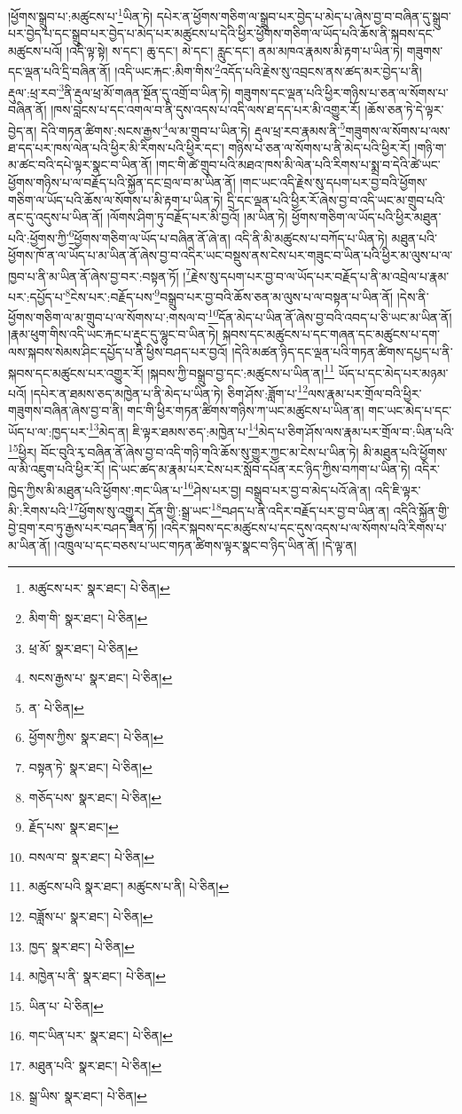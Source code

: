 །ཕྱོགས་སྒྲུབ་པ་:མཚུངས་པ་\footnote{མཚུངས་པར་  སྣར་ཐང་།  པེ་ཅིན། }ཡིན་ཏེ། དཔེར་ན་ཕྱོགས་གཅིག་ལ་སྒྲུབ་པར་བྱེད་པ་མེད་པ་ཞེས་བྱ་བ་བཞིན་དུ་སྒྲུབ་པར་བྱེད་པ་དང་སྒྲུབ་པར་བྱེད་པ་མེད་པར་མཚུངས་པ་དེའི་ཕྱིར་ཕྱོགས་གཅིག་ལ་ཡོད་པའི་ཆོས་ནི་སྐབས་དང་མཚུངས་པའོ། །འདི་ལྟ་སྟེ། ས་དང་། ཆུ་དང་། མེ་དང་། རླུང་དང་། ནམ་མཁའ་རྣམས་མི་རྟག་པ་ཡིན་ཏེ། གཟུགས་དང་ལྡན་པའི་དྲི་བཞིན་ནོ། །འདི་ཡང་རྐང་:མིག་གིས་\footnote{མིག་གི་  སྣར་ཐང་།  པེ་ཅིན། }འདོད་པའི་རྗེས་སུ་འབྲངས་ནས་ཚད་མར་བྱེད་པ་ནི། རྡུལ་:ཕྲ་རབ་\footnote{ཕྲ་མོ་  སྣར་ཐང་།  པེ་ཅིན། }ནི་རྡུལ་ཕྲ་མོ་གཞན་སྔོན་དུ་འགྲོ་བ་ཡིན་ཏེ། གཟུགས་དང་ལྡན་པའི་ཕྱིར་གཉིས་པ་ཅན་ལ་སོགས་པ་བཞིན་ནོ། །ཁས་བླངས་པ་དང་འགལ་བ་ནི་དུས་འདས་པ་འདི་ལས་ཐ་དད་པར་མི་འགྱུར་རོ། །ཆོས་ཅན་ཏེ་དེ་ལྟར་བྱེད་ན། དེའི་གཏན་ཚིགས་:སངས་རྒྱས་\footnote{སངས་རྒྱས་པ་  སྣར་ཐང་།  པེ་ཅིན། }ལ་མ་གྲུབ་པ་ཡིན་ཏེ། རྡུལ་ཕྲ་རབ་རྣམས་ནི་\footnote{ན་  པེ་ཅིན། }གཟུགས་ལ་སོགས་པ་ལས་ཐ་དད་པར་ཁས་ལེན་པའི་ཕྱིར་མི་རིགས་པའི་ཕྱིར་དང་། གཉིས་པ་ཅན་ལ་སོགས་པ་ནི་མེད་པའི་ཕྱིར་རོ། །གཉི་ག་མ་ཚང་བའི་དཔེ་ལྟར་སྣང་བ་ཡིན་ནོ། །གང་གི་ཚེ་གྲུབ་པའི་མཐའ་ཁས་མི་ལེན་པའི་རིགས་པ་སྨྲ་བ་དེའི་ཚེ་ཡང་ཕྱོགས་གཉིས་པ་ལ་བརྗོད་པའི་སྐྱོན་དང་བྲལ་བ་མ་ཡིན་ནོ། །གང་ཡང་འདི་རྗེས་སུ་དཔག་པར་བྱ་བའི་ཕྱོགས་གཅིག་ལ་ཡོད་པའི་ཆོས་ལ་སོགས་པ་མི་རྟག་པ་ཡིན་ཏེ། དྲི་དང་ལྡན་པའི་ཕྱིར་རོ་ཞེས་བྱ་བ་འདི་ཡང་མ་གྲུབ་པའི་ནང་དུ་འདུས་པ་ཡིན་ནོ། །ལོགས་ཤིག་ཏུ་བརྗོད་པར་མི་བྱའོ། །མ་ཡིན་ཏེ། ཕྱོགས་གཅིག་ལ་ཡོད་པའི་ཕྱིར་མཐུན་པའི་:ཕྱོགས་ཀྱི་\footnote{ཕྱོགས་ཀྱིས་  སྣར་ཐང་།  པེ་ཅིན། }ཕྱོགས་གཅིག་ལ་ཡོད་པ་བཞིན་ནོ་ཞེ་ན། འདི་ནི་མི་མཚུངས་པ་བཀོད་པ་ཡིན་ཏེ། མཐུན་པའི་ཕྱོགས་ཁོ་ན་ལ་ཡོད་པ་མ་ཡིན་ནོ་ཞེས་བྱ་བ་འདིར་ཡང་བསྡུས་ནས་ངེས་པར་གཟུང་བ་ཡིན་པའི་ཕྱིར་མ་ལུས་པ་ལ་ཁྱབ་པ་ནི་མ་ཡིན་ནོ་ཞེས་བྱ་བར་:བསྟན་ཏོ། །\footnote{བསྟན་ཏེ་  སྣར་ཐང་།  པེ་ཅིན། }རྗེས་སུ་དཔག་པར་བྱ་བ་ལ་ཡོད་པར་བརྗོད་པ་ནི་མ་འབྲེལ་པ་རྣམ་པར་:དཔྱོད་པ་\footnote{གཅོད་པས་  སྣར་ཐང་།  པེ་ཅིན། }ངེས་པར་:བརྗོད་པས་\footnote{རྗོད་པས་  སྣར་ཐང་། }བསྒྲུབ་པར་བྱ་བའི་ཆོས་ཅན་མ་ལུས་པ་ལ་བསྟན་པ་ཡིན་ནོ། །དེས་ནི་ཕྱོགས་གཅིག་ལ་མ་གྲུབ་པ་ལ་སོགས་པ་:གསལ་བ་\footnote{བསལ་བ་  སྣར་ཐང་།  པེ་ཅིན། }དོན་མེད་པ་ཡིན་ནོ་ཞེས་བྱ་བའི་འབད་པ་ཅི་ཡང་མ་ཡིན་ནོ། །རྣམ་ཕུག་གིས་འདི་ཡང་རྐང་པ་རྡུང་དུ་ལྷུང་བ་ཡིན་ཏེ། སྐབས་དང་མཚུངས་པ་དང་གཞན་དང་མཚུངས་པ་དག་ལས་སྐབས་སེམས་ཤིང་དཔྱོད་པ་ནི་ཕྱིས་བཤད་པར་བྱའོ། །དེའི་མཚན་ཉིད་དང་ལྡན་པའི་གཏན་ཚིགས་དཔྱད་པ་ནི་སྐབས་དང་མཚུངས་པར་འགྱུར་རོ། །སྐབས་ཀྱི་བསྒྲུབ་བྱ་དང་:མཚུངས་པ་ཡིན་ན།\footnote{མཚུངས་པའི  སྣར་ཐང་། མཚུངས་པ་ནི།  པེ་ཅིན། } ཡོད་པ་དང་མེད་པར་མཉམ་པའོ། །དཔེར་ན་ཐམས་ཅད་མཁྱེན་པ་ནི་མེད་པ་ཡིན་ཏེ། ཅིག་ཤོས་:ཟློག་པ་\footnote{བཟློས་པ་  སྣར་ཐང་།  པེ་ཅིན། }ལས་རྣམ་པར་གྲོལ་བའི་ཕྱིར་གཟུགས་བཞིན་ཞེས་བྱ་བ་ནི། གང་གི་ཕྱིར་གཏན་ཚིགས་གཉིས་ཀ་ཡང་མཚུངས་པ་ཡིན་ན། གང་ཡང་མེད་པ་དང་ཡོད་པ་ལ་:ཁྱད་པར་\footnote{ཁྱད་  སྣར་ཐང་།  པེ་ཅིན། }མེད་ན། ཇི་ལྟར་ཐམས་ཅད་:མཁྱེན་པ་\footnote{མཁྱེན་པ་ནི་  སྣར་ཐང་།  པེ་ཅིན། }མེད་པ་ཅིག་ཤོས་ལས་རྣམ་པར་གྲོལ་བ་:ཡིན་པའི་\footnote{ཡིན་པ་  པེ་ཅིན། }ཕྱིར། བོང་བུའི་རྭ་བཞིན་ནོ་ཞེས་བྱ་བ་འདི་གཉི་གའི་ཆོས་སུ་གྱུར་ཀྱང་མ་ངེས་པ་ཡིན་ཏེ། མི་མཐུན་པའི་ཕྱོགས་ལ་མི་འཇུག་པའི་ཕྱིར་རོ། །དེ་ཡང་ཚད་མ་རྣམ་པར་ངེས་པར་སློབ་དཔོན་རང་ཉིད་ཀྱིས་བཀག་པ་ཡིན་ཏེ། འདིར་ཁྱེད་ཀྱིས་མི་མཐུན་པའི་ཕྱོགས་:གང་ཡིན་པ་\footnote{གང་ཡིན་པར་  སྣར་ཐང་།  པེ་ཅིན། }ཤེས་པར་བྱ། བསྒྲུབ་པར་བྱ་བ་མེད་པའོ་ཞེ་ན། འདི་ཇི་ལྟར་མི་:རིགས་པའི་\footnote{མཐུན་པའི་  སྣར་ཐང་།  པེ་ཅིན། }ཕྱོགས་སུ་འགྱུར། དོན་གྱི་:སྒྲ་ཡང་\footnote{སྒྲ་ཡིས་  སྣར་ཐང་།  པེ་ཅིན། }བཤད་པ་ནི་འདིར་བརྗོད་པར་བྱ་བ་ཡིན་ན། འདིའི་སྐྱོན་གྱི་བྱེ་བྲག་རབ་ཏུ་རྒྱས་པར་བཤད་ཟིན་ཏོ། །འདིར་སྐབས་དང་མཚུངས་པ་དང་དུས་འདས་པ་ལ་སོགས་པའི་རིགས་པ་མ་ཡིན་ནོ། །འཁྲུལ་པ་དང་བཅས་པ་ཡང་གཏན་ཚིགས་ལྟར་སྣང་བ་ཉིད་ཡིན་ནོ། །དེ་ལྟ་ན། 